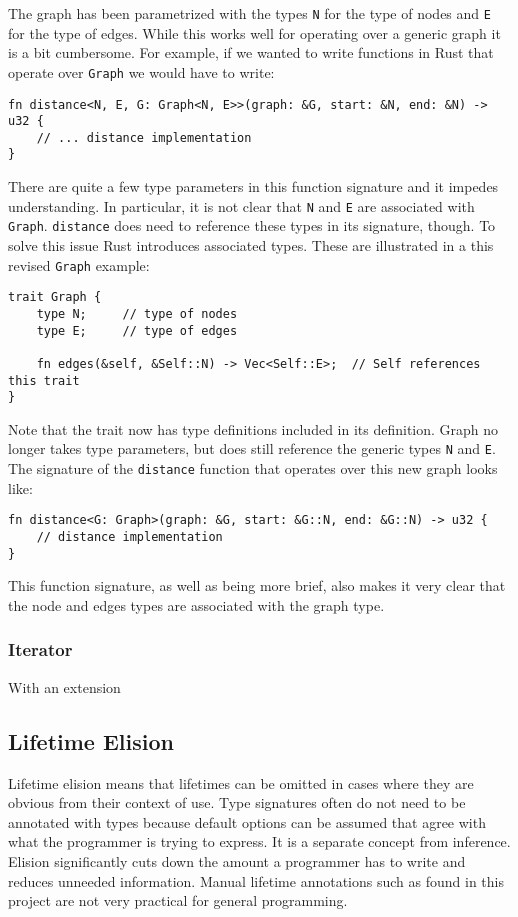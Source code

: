 The graph has been parametrized with the types \lstinline{N} for the type of 
nodes and \lstinline{E} for the type of edges. While this works well for operating
over a generic graph it is a bit cumbersome. For example, if we wanted to write
functions in Rust that operate over \lstinline{Graph} we would have to write:

\begin{lstlisting}[nolol]
fn distance<N, E, G: Graph<N, E>>(graph: &G, start: &N, end: &N) -> u32 {
    // ... distance implementation
}
\end{lstlisting}

There are quite a few type parameters in this function signature and it impedes
understanding. In particular, it is not clear that \lstinline{N} and
\lstinline{E} are associated with \lstinline{Graph}. \lstinline{distance} does
need to reference these types in its signature, though. To solve this issue
Rust introduces associated types. These are illustrated in a this revised 
\lstinline{Graph} example:

\begin{lstlisting}[nolol]
trait Graph {
    type N;     // type of nodes
    type E;     // type of edges

    fn edges(&self, &Self::N) -> Vec<Self::E>;  // Self references this trait
}
\end{lstlisting}

Note that the trait now has type definitions included in its definition. Graph
no longer takes type parameters, but does still reference the generic types
\lstinline{N} and \lstinline{E}. The signature of the \lstinline{distance}
function that operates over this new graph looks like:

\begin{lstlisting}[nolol]
fn distance<G: Graph>(graph: &G, start: &G::N, end: &G::N) -> u32 {
    // distance implementation
}
\end{lstlisting}

This function signature, as well as being more brief, also makes it very clear
that the node and edges types are associated with the graph type. 

\subsubsection{Iterator}
With an extension

\subsection{Lifetime Elision}
Lifetime elision means that lifetimes can be omitted in cases where they are
obvious from their context of use. Type signatures often do not need to be
annotated with types because default options can be assumed that agree with
what the programmer is trying to express. It is a separate concept from
inference. Elision significantly cuts down the amount a programmer has to write
and reduces unneeded information. Manual lifetime annotations such as found in
this project are not very practical for general programming.

